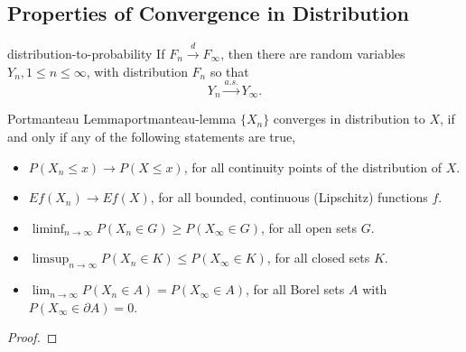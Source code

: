 \subsection{Properties of Convergence in Distribution}

\begin{lemma}{}{distribution-to-probability}
    If $F_n\stackrel{d}{\rightarrow}F_\infty$, then there are random variables $Y_n,1\leq n\leq \infty$, with distribution $F_n$ so that
    \begin{equation}
        Y_n\stackrel{a.s.}{\rightarrow}Y_\infty.
    \end{equation}
\end{lemma}

\begin{theorem}{Portmanteau Lemma}{portmanteau-lemma}
    $\{X_n\}$ converges in distribution to $X$, if and only if any of the following statements are true,
    \begin{itemize}
        \item $P(X_n\leq x)\rightarrow P(X\leq x)$, for all continuity points of the distribution of $X$.
        \item $Ef(X_n)\rightarrow Ef(X)$, for all bounded, continuous (Lipschitz) functions $f$.
        \item $\liminf_{n\rightarrow\infty}P\left(X_{n} \in G\right)\geq P\left(X_{\infty}\in G\right)$, for all open sets $G$.
        \item $\limsup_{n \rightarrow\infty}P\left(X_{n} \in K\right) \leq P\left(X_{\infty} \in K\right)$, for all closed sets $K$.
        \item $\lim_{n\rightarrow\infty}P\left(X_{n}\in A\right)=P\left(X_{\infty}\in A\right)$, for all Borel sets $A$ with $P\left(X_{\infty}\in \partial A\right)=0$.
    \end{itemize}
\end{theorem}

\begin{proof}

\end{proof}

